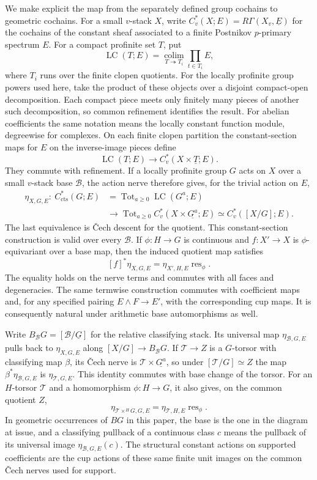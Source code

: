 We make explicit the map from the separately defined group cochains to
geometric cochains.  For a small $v$-stack $X$, write
$C_v^*(X;E)=R\Gamma(X_v,\underline E)$ for the cochains of the constant
sheaf associated to a finite Postnikov $p$-primary spectrum $E$.  For a
compact profinite set $T$, put
\[
 \operatorname{LC}(T;E)
   =\operatorname*{colim}_{T\twoheadrightarrow T_i}
       \prod_{t\in T_i}E,
\]
where $T_i$ runs over the finite clopen quotients.  For the locally
profinite group powers used here, take the product of these objects over
a disjoint compact-open decomposition.  Each compact piece meets only
finitely many pieces of another such decomposition, so common refinement
identifies the result.  For abelian coefficients the same notation means
the locally constant function module, degreewise for complexes.  On each
finite clopen partition the
constant-section maps for $E$ on the inverse-image pieces define
\[
 \operatorname{LC}(T;E)\longrightarrow
 C_v^*(X\times\underline T;E).
\]
They commute with refinement.  If a locally profinite group $G$ acts on
$X$ over a small $v$-stack base $\mathcal B$, the action nerve therefore
gives, for the trivial action on $E$,
\[
 \begin{split}
 \eta_{X,G,E}:\ C^*_{\mathrm{cts}}(G;E)
   &=\operatorname{Tot}_{a\geq0}\operatorname{LC}(G^a;E)\\
   &\longrightarrow
     \operatorname{Tot}_{a\geq0}
       C_v^*(X\times\underline{G^a};E)
       \simeq C_v^*([X/G];E).
 \end{split}
\]
The last equivalence is \v{C}ech descent for the quotient.  This
constant-section construction is valid over every $\mathcal B$.
If $\phi:H\to G$ is continuous and $f:X'\to X$ is $\phi$-equivariant
over a base map, then the induced quotient map satisfies
\[
 [f]^*\eta_{X,G,E}
   =\eta_{X',H,E}\operatorname{res}_{\phi}.
\]
The equality holds on the nerve terms and commutes with all faces and
degeneracies.  The same termwise construction commutes with coefficient
maps and, for any specified pairing $E\wedge F\to E'$, with the
corresponding cup maps.  It is consequently natural under arithmetic
base automorphisms as well.

Write $B_{\mathcal B}G=[\mathcal B/\underline G]$ for the relative
classifying stack.  Its universal map $\eta_{\mathcal B,G,E}$ pulls back
to $\eta_{X,G,E}$ along $[X/G]\to B_{\mathcal B}G$.  If
$\mathcal T\to Z$ is a $G$-torsor with classifying map $\beta$, its
\v{C}ech nerve is $\mathcal T\times\underline{G^a}$, so under
$[\mathcal T/G]\simeq Z$ the map $\beta^*\eta_{\mathcal B,G,E}$ is
$\eta_{\mathcal T,G,E}$.  This identity commutes with base change of the
torsor.  For an $H$-torsor $\mathcal T$ and a homomorphism $\phi:H\to G$,
it also gives, on the common quotient $Z$,
\[
 \eta_{\mathcal T\times^H G,G,E}
   =\eta_{\mathcal T,H,E}\operatorname{res}_{\phi}.
\]
In geometric occurrences of $BG$ in this paper, the base is the one in
the diagram at issue, and a classifying pullback of a continuous class
$c$ means the pullback of its universal image
$\eta_{\mathcal B,G,E}(c)$.  The structural constant actions on supported
coefficients are the cup actions of these same finite unit images on the
common \v{C}ech nerves used for support.

